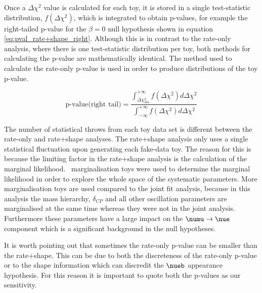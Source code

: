 Once a $\Delta \chi^2$ value is calculated for each toy, it is stored in a single test-statistic distribution, $f \left( \Delta \chi^2 \right)$, which is integrated to obtain p-values, for example the right-tailed p-value for the $\beta = 0$ null hypothesis shown in equation \ref{eq:pval_rate+shape_right}. Although this is in contrast to the rate-only analysis, where there is one test-statistic distribution per toy, both methods for calculating the p-value are mathematically identical. The method used to calculate the rate-only p-value is used in order to produce distributions of the toy p-value.

\begin{equation} \label{eq:pval_rate+shape_right}
\textrm{p-value} \textrm{(right tail)} = 
\frac{\int_{\Delta \chi^2_{obs}}^{+\infty} f \left( \Delta \chi^2 \right) d\Delta \chi^2}{\int_{-\infty}^{+\infty} f \left( \Delta \chi^2 \right) d\Delta \chi^2}
\end{equation}

The number of statistical throws from each toy data set is different between the rate-only and rate+shape analyses. The rate+shape analysis only uses a single statistical fluctuation upon generating each fake-data toy. The reason for this is because the limiting factor in the rate+shape analysis is the calculation of the marginal likelihood. \NToysMarg\ marginalisation toys were used to determine the marginal likelihood in order to explore the whole space of the systematic parameters. More marginalisation toys are used compared to the joint fit analysis, because in this analysis the mass hierarchy, $\delta_{CP}$ and all other oscillation parameters are marginalised at the same time whereas they were not in the joint analysis. Furthermore these parameters have a large impact on the $\numu \rightarrow \nue$ component which is a significant background in the null hypotheses.

It is worth pointing out that sometimes the rate-only p-value can be smaller than the rate+shape. This can be due to both the discreteness of the rate-only p-value or to the shape information which can discredit the $\nueb$ appearance hypothesis. For this reason it is important to quote both the p-values as our sensitivity.

